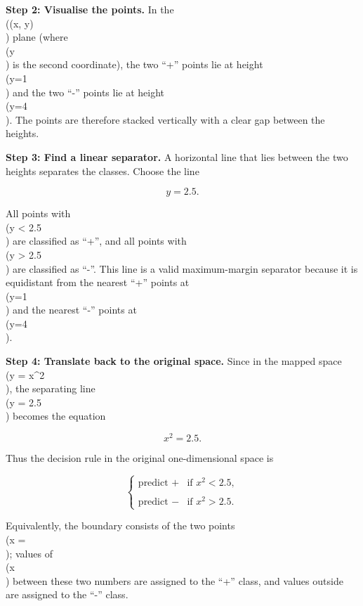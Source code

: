 \documentclass[12pt, a4paper]{article}
\begin{document}
\textbf{Step 2: Visualise the points.}  
In the \\((x, y)\\) plane (where \\(y\\) is the second coordinate), the two ``+'' points lie at height \\(y=1\\) and the two ``-'' points lie at height \\(y=4\\). The points are therefore stacked vertically with a clear gap between the heights.

\textbf{Step 3: Find a linear separator.}  
A horizontal line that lies between the two heights separates the classes. Choose the line

\[
y = 2.5 .
\]

All points with \\(y < 2.5\\) are classified as ``+'', and all points with \\(y > 2.5\\) are classified as ``-''. This line is a valid maximum-margin separator because it is equidistant from the nearest ``+'' points at \\(y=1\\) and the nearest ``-'' points at \\(y=4\\).

\textbf{Step 4: Translate back to the original space.}  
Since in the mapped space \\(y = x^{2}\\), the separating line \\(y = 2.5\\) becomes the equation

\[
x^{2} = 2.5 .
\]

Thus the decision rule in the original one-dimensional space is

\[
\begin{cases}
\text{predict } + & \text{if } x^{2} < 2.5, \\\\
\text{predict } - & \text{if } x^{2} > 2.5 .
\end{cases}
\]

Equivalently, the boundary consists of the two points \\(x = \pm{}\approx {}\\); values of \\(x\\) between these two numbers are assigned to the ``+'' class, and values outside are assigned to the ``-'' class.
\end{document}
